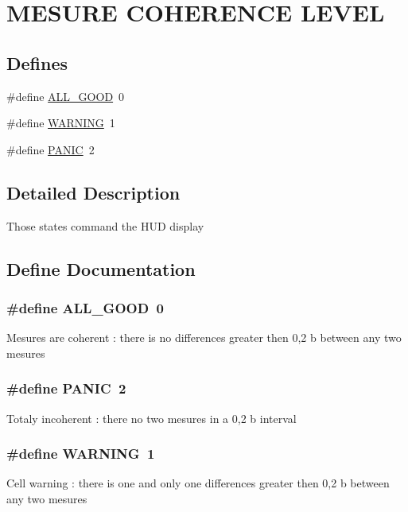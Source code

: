\hypertarget{group__group5}{
\section{MESURE COHERENCE LEVEL}
\label{group__group5}
}
\subsection*{Defines}
\begin{DoxyCompactItemize}
\item 
\#define \hyperlink{group__group5_ga74da21a14b4d46eaa0d1bf33d8eb8867}{ALL\_\-GOOD}~0
\item 
\#define \hyperlink{group__group5_ga5cb439d9f933fde4cf23caa370c030e7}{WARNING}~1
\item 
\#define \hyperlink{group__group5_ga83407c90dbd7ab867fe438dc3e5d9373}{PANIC}~2
\end{DoxyCompactItemize}


\subsection{Detailed Description}
Those states command the HUD display 

\subsection{Define Documentation}
\hypertarget{group__group5_ga74da21a14b4d46eaa0d1bf33d8eb8867}{
\subsubsection[{ALL\_\-GOOD}]{\setlength{\rightskip}{0pt plus 5cm}\#define ALL\_\-GOOD~0}}
\label{group__group5_ga74da21a14b4d46eaa0d1bf33d8eb8867}
Mesures are coherent : there is no differences greater then 0,2 b between any two mesures \hypertarget{group__group5_ga83407c90dbd7ab867fe438dc3e5d9373}{
\subsubsection[{PANIC}]{\setlength{\rightskip}{0pt plus 5cm}\#define PANIC~2}}
\label{group__group5_ga83407c90dbd7ab867fe438dc3e5d9373}
Totaly incoherent : there no two mesures in a 0,2 b interval \hypertarget{group__group5_ga5cb439d9f933fde4cf23caa370c030e7}{
\subsubsection[{WARNING}]{\setlength{\rightskip}{0pt plus 5cm}\#define WARNING~1}}
\label{group__group5_ga5cb439d9f933fde4cf23caa370c030e7}
Cell warning : there is one and only one differences greater then 0,2 b between any two mesures 